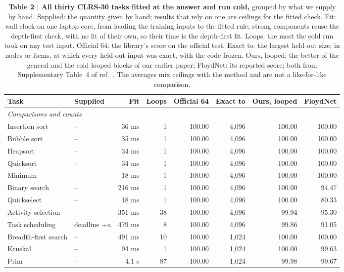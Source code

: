 \documentclass[10pt]{article}
\newcommand{\figlabel}[2]{\textbf{#1 $|$ #2}}
\begin{document}
\begin{table}[tbp]\centering\scriptsize
\caption{\figlabel{Table 2}{All thirty CLRS-30 tasks fitted at the answer and run cold,} grouped by what we supply by
hand. Supplied: the quantity given by hand; results that rely on one are ceilings for the fitted check. Fit: wall clock on one laptop core, from loading the training inputs to the fitted rule; strong components reuse
the depth-first check, with no fit of their own, so their time is the depth-first fit. Loops: the most the cold run took
on any test input. Official 64: the library's score on the
official test. Exact to: the largest held-out size, in nodes or items, at which every held-out input was exact, with the
code frozen. Ours, looped: the better of the general and the cold looped blocks of our earlier paper; FloydNet: its
reported score\cite{yu2026floydnet}; both from Supplementary Table~4 of ref.~\cite{mohsenvand2026zero}. The averages mix
ceilings with the method and are not a like-for-like comparison.}\label{tab:clrs}
\setlength{\tabcolsep}{4.5pt}
\begin{tabular}{llrrrrrr}\toprule
Task & Supplied & Fit & Loops & Official 64 & Exact to & Ours, looped & FloydNet \\\midrule
\multicolumn{8}{l}{\textit{Comparisons and counts}} \\
Insertion sort & -- & 36 ms & 1 & 100.00 & 4,096 & 100.00 & 100.00 \\
Bubble sort & -- & 35 ms & 1 & 100.00 & 4,096 & 100.00 & 100.00 \\
Heapsort & -- & 34 ms & 1 & 100.00 & 4,096 & 100.00 & 100.00 \\
Quicksort & -- & 34 ms & 1 & 100.00 & 4,096 & 100.00 & 100.00 \\
Minimum & -- & 18 ms & 1 & 100.00 & 4,096 & 100.00 & 100.00 \\
Binary search & -- & 216 ms & 1 & 100.00 & 4,096 & 100.00 & 94.47 \\
Quickselect & -- & 18 ms & 1 & 100.00 & 4,096 & 100.00 & 80.33 \\
Activity selection & -- & 351 ms & 38 & 100.00 & 4,096 & 99.94 & 95.30 \\
Task scheduling & deadline $\div n$ & 479 ms & 8 & 100.00 & 4,096 & 99.86 & 91.05 \\
Breadth-first search & -- & 491 ms & 10 & 100.00 & 1,024 & 100.00 & 100.00 \\
Kruskal & -- & 94 ms & 1 & 100.00 & 1,024 & 100.00 & 99.63 \\
Prim & -- & 4.1 s & 87 & 100.00 & 1,024 & 99.98 & 99.67 \\

\end{tabular}
\end{table}
\end{document}
